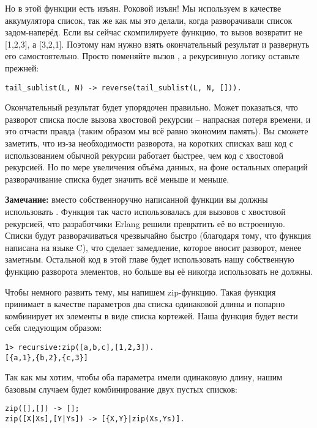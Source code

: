 Но в этой функции есть изъян. Роковой изъян! Мы используем в качестве аккумулятора список, так же как мы это делали, когда разворачивали список задом\--наперёд. Если вы сейчас скомпилируете функцию, то вызов  возвратит не [1,2,3], а [3,2,1]. Поэтому нам нужно взять окончательный результат и развернуть его самостоятельно. Просто поменяйте вызов , а рекурсивную логику оставьте прежней:
\begin{lstlisting}[style=erlang]
tail_sublist(L, N) -> reverse(tail_sublist(L, N, [])).
\end{lstlisting}

Окончательный результат будет упорядочен правильно. Может показаться, что разворот списка после вызова хвостовой рекурсии \--- напрасная потеря времени, и это отчасти правда (таким образом мы всё равно экономим память). Вы сможете заметить, что из\--за необходимости разворота, на коротких списках ваш код с использованием обычной рекурсии работает быстрее, чем код с хвостовой рекурсией. Но по мере увеличения объёма данных, на фоне остальных операций разворачивание списка будет значить всё меньше и меньше.\\
\colorbox{lgray}
{
    \begin{minipage}{\linewidth}
\textbf{Замечание:} вместо собственноручно написанной функции  вы должны использовать . Функция так часто использовалась для вызовов с хвостовой рекурсией, что разработчики Erlang решили превратить её во встроенную. Списки будут разворачиваться чрезвычайно быстро (благодаря тому, что функция написана на языке C), что сделает замедление, которое вносит разворот, менее заметным. Остальной код в этой главе будет использовать нашу собственную функцию разворота элементов, но больше вы её никогда использовать не должны.
    \end{minipage}
}

Чтобы немного развить тему, мы напишем zip\--функцию. Такая функция принимает в качестве параметров два списка одинаковой длины и попарно комбинирует их элементы в виде списка кортежей. Наша функция  будет вести себя следующим образом:
\begin{lstlisting}[style=erlang]
1> recursive:zip([a,b,c],[1,2,3]).
[{a,1},{b,2},{c,3}]
\end{lstlisting}

Так как мы хотим, чтобы оба параметра имели одинаковую длину, нашим базовым случаем будет комбинирование двух пустых списков:
\begin{lstlisting}[style=erlang]
zip([],[]) -> [];
zip([X|Xs],[Y|Ys]) -> [{X,Y}|zip(Xs,Ys)].
\end{lstlisting}

